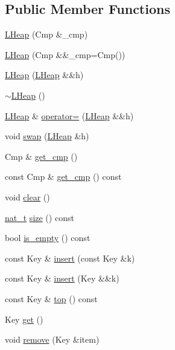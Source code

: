 \subsection*{Public Member Functions}
\begin{DoxyCompactItemize}
\item 
\hyperlink{class_designar_1_1_l_heap_ad645d2b25a8a0cbd4ccfcab02eee1740}{L\+Heap} (Cmp \&\+\_\+cmp)
\item 
\hyperlink{class_designar_1_1_l_heap_a38871440fd0a6f313ed2034e0b85d723}{L\+Heap} (Cmp \&\&\+\_\+cmp=Cmp())
\item 
\hyperlink{class_designar_1_1_l_heap_aacf981076833b8ae14c2f931f76bd4d0}{L\+Heap} (\hyperlink{class_designar_1_1_l_heap}{L\+Heap} \&\&h)
\item 
\hyperlink{class_designar_1_1_l_heap_ae8222af1e06c39acc9ae21589c70b874}{$\sim$\+L\+Heap} ()
\item 
\hyperlink{class_designar_1_1_l_heap}{L\+Heap} \& \hyperlink{class_designar_1_1_l_heap_a734877d8fa46c22a5e11eb18d3221c55}{operator=} (\hyperlink{class_designar_1_1_l_heap}{L\+Heap} \&\&h)
\item 
void \hyperlink{class_designar_1_1_l_heap_ad8231f41b79545dc4655d401ba1d4fc2}{swap} (\hyperlink{class_designar_1_1_l_heap}{L\+Heap} \&h)
\item 
Cmp \& \hyperlink{class_designar_1_1_l_heap_a2c704057a03ec82052cf916142709506}{get\+\_\+cmp} ()
\item 
const Cmp \& \hyperlink{class_designar_1_1_l_heap_a2cb81067a531983f16aba240cd2dcde5}{get\+\_\+cmp} () const
\item 
void \hyperlink{class_designar_1_1_l_heap_a19ea9506d108cdb3662f936e21483c1d}{clear} ()
\item 
\hyperlink{namespace_designar_aa72662848b9f4815e7bf31a7cf3e33d1}{nat\+\_\+t} \hyperlink{class_designar_1_1_l_heap_ad5d78ccd18f1352b55b3daf3592a9fdd}{size} () const
\item 
bool \hyperlink{class_designar_1_1_l_heap_a03ae70dddd0511210308b666c69c75e5}{is\+\_\+empty} () const
\item 
const Key \& \hyperlink{class_designar_1_1_l_heap_afda890a8ad2058013a93ec6b3dbcb38d}{insert} (const Key \&k)
\item 
const Key \& \hyperlink{class_designar_1_1_l_heap_a45e3853d6d7cd17fd5b56aa572fd6042}{insert} (Key \&\&k)
\item 
const Key \& \hyperlink{class_designar_1_1_l_heap_a3251c1ef23f6d8f30dec65b8c500d506}{top} () const
\item 
Key \hyperlink{class_designar_1_1_l_heap_ae8fe8b715ed64d66763a20e409b76bd3}{get} ()
\item 
void \hyperlink{class_designar_1_1_l_heap_aa04116770ec4bdd66f83ecd19677ce01}{remove} (Key \&item)
\end{DoxyCompactItemize}


